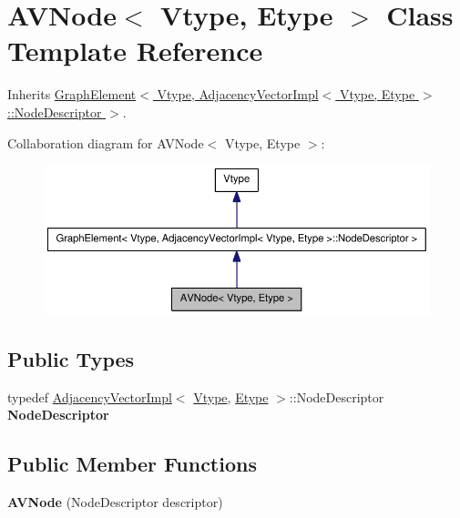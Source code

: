\hypertarget{class_a_v_node}{
\section{AVNode$<$ Vtype, Etype $>$ Class Template Reference}
\label{class_a_v_node}
}


Inherits \hyperlink{class_graph_element}{GraphElement$<$ Vtype, AdjacencyVectorImpl$<$ Vtype, Etype $>$::NodeDescriptor $>$}.



Collaboration diagram for AVNode$<$ Vtype, Etype $>$:\nopagebreak
\begin{figure}[H]
\begin{center}
\leavevmode
\includegraphics[width=400pt]{class_a_v_node__coll__graph}
\end{center}
\end{figure}
\subsection*{Public Types}
\begin{DoxyCompactItemize}
\item 
\hypertarget{class_a_v_node_a51281c409366d0ca02185ef27ac541ec}{
typedef \hyperlink{class_adjacency_vector_impl}{AdjacencyVectorImpl}$<$ \hyperlink{class_vtype}{Vtype}, \hyperlink{class_etype}{Etype} $>$::NodeDescriptor {\bfseries NodeDescriptor}}
\label{class_a_v_node_a51281c409366d0ca02185ef27ac541ec}

\end{DoxyCompactItemize}
\subsection*{Public Member Functions}
\begin{DoxyCompactItemize}
\item 
\hypertarget{class_a_v_node_a365edb66973aa6d97820c4ddeaf2fe9d}{
{\bfseries AVNode} (NodeDescriptor descriptor)}
\label{class_a_v_node_a365edb66973aa6d97820c4ddeaf2fe9d}

\end{DoxyCompactItemize}
